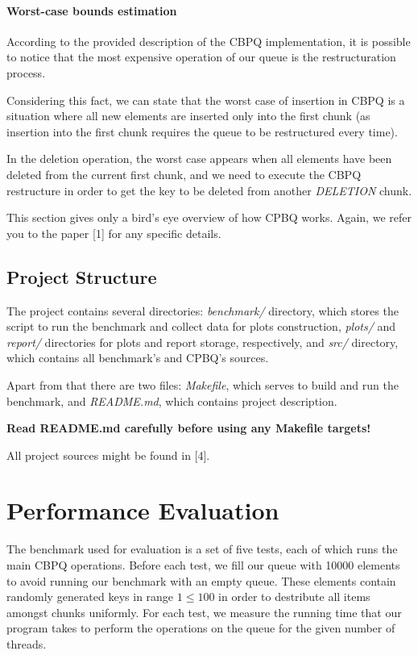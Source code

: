 \documentclass{article}
\begin{document}
  \paragraph{Worst-case bounds estimation}\mbox{}\par 

  According to the provided description of the CBPQ implementation, it is possible to notice that the most expensive operation of our queue is the restructuration process.\par

  Considering this fact, we can state that the worst case of insertion in CBPQ is a situation where all new elements are inserted only into the first chunk (as insertion into the first chunk requires the queue to be restructured every time).\par

  In the deletion operation, the worst case appears when all elements have been deleted from the current first chunk, and we need to execute the CBPQ restructure in order to get the key to be deleted from another \emph{DELETION} chunk.\newline\par

  This section gives only a bird's eye overview of how CPBQ works. Again, we refer you to the paper [1] for any specific details.

  \subsection{Project Structure}

  The project contains several directories: \textit{benchmark/} directory, which stores the script to run the benchmark and collect data for plots construction, \textit{plots/} and \textit{report/} directories for plots and report storage, respectively, and \textit{src/} directory, which contains all benchmark's and CPBQ's sources.\par

  Apart from that there are two files: \textit{Makefile}, which serves to build and run the benchmark, and \textit{README.md}, which contains project description.\par

  \textbf{Read README.md carefully before using any Makefile targets!}\par
  All project sources might be found in [4].

  \section{Performance Evaluation}
  The benchmark used for evaluation is a set of five tests, each of which runs the main CBPQ operations. Before each test, we fill our queue with 10000 elements to avoid running our benchmark with an empty queue. These elements contain randomly generated keys in range $1 \leqslant 100$ in order to destribute all items amongst chunks uniformly. For each test, we measure the running time that our program takes to perform the operations on the queue for the given number of threads.\par
\end{document}
